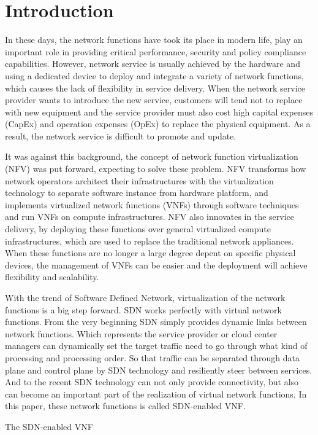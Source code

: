 \section{Introduction}
In these days, the network functions have took its place in modern life, play an important role in providing critical performance, security and policy compliance capabilities. However, network service is usually achieved by the hardware and using a dedicated device to deploy and integrate a variety of network functions, which causes the lack of flexibility in service delivery. When the network service provider wants to introduce the new service, customers will tend not to replace with new equipment and the service provider must also cost high capital expenses (CapEx) and operation expenses (OpEx) to replace the physical equipment. As a result, the network service is difficult to promote and update.

It was against this background, the concept of network function virtualization (NFV) was put forward, expecting to solve these problem. NFV transforms how network operators
architect their infrastructures with the virtualization technology to separate software instance from hardware platform, and implements virtualized network functions (VNFs) through software  techniques and run VNFs on compute infrastructures. NFV also innovates in the service delivery, by deploying these functions over general virtualized compute infrastructures, which are used to replace the traditional network appliances. When these functions are no longer a large degree depent on specific physical devices, the management of VNFs can be easier and the deployment will achieve flexibility and scalability.

With the trend of Software Defined Network, virtualization of the network functions is a big step forward. SDN works perfectly with virtual network functions. From the very beginning SDN simply provides dynamic links between network functions. Which represents the service provider or cloud center managers can dynamically set the target traffic need to go through what kind of processing and processing order. So that traffic can be separated through data plane and control plane by SDN technology and resiliently steer between services. And to the recent SDN technology can not only provide connectivity, but also can become an important part of the realization of virtual network functions. In this paper, these network functions is called SDN-enabled VNF.


The SDN-enabled VNF



